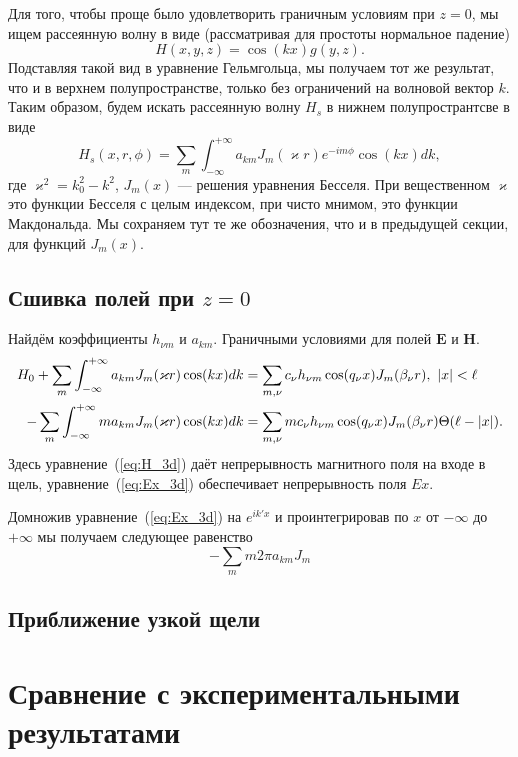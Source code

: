 Для того, чтобы проще было удовлетворить граничным условиям при $z = 0$,
мы ищем рассеянную волну в виде (рассматривая для простоты нормальное падение)
$$
    H(x,y,z) = \cos(k x)g(y,z).
$$
Подставляя такой вид в уравнение Гельмгольца, мы получаем тот же результат, что и в верхнем полупространстве, только без ограничений на 
волновой вектор $k$. Таким образом, будем искать рассеянную волну $H_s$ в нижнем полупространтсве в виде
\begin{equation}
    H_{s}(x,r,\phi) = \sum_{m} \int_{-\infty}^{+\infty} a_{km} J_m(\varkappa r) e^{-i m \phi} \cos(k x) dk,
\end{equation}
где $\varkappa^2 = k_0^2 - k^2$, $J_m(x)$ --- решения уравнения Бесселя. При вещественном $\varkappa$ это функции Бесселя с целым индексом, при чисто мнимом, это функции Макдональда. Мы сохраняем тут те же обозначения, что и в предыдущей секции, для функций $J_m(x)$.

\section{Сшивка полей при $z = 0$}
Найдём коэффициенты $h_{\nu m}$ и $a_{km}$. Граничными условиями для полей $\mathbf{E}$ и $\mathbf{H}$. 
\begin{align}
    H_0 +  \sum_{m} \int_{-\infty}^{+\infty} a_{km} J_m(\varkappa r) \cos(k x) dk &= \sum_{m,\nu}c_\nu h_{\nu m}\cos(q_\nu x) J_m(\beta_\nu r), \ \lvert x\rvert < \ell\label{eq:H_3d}  \\
    -\sum_{m} \int_{-\infty}^{+\infty} m a_{km} J_m(\varkappa r) \cos(k x) dk &= \sum_{m,\nu}m c_\nu h_{\nu m}\cos(q_\nu x) J_m(\beta_\nu r)\Theta(\ell- \lvert x\rvert)  \label{eq:Ex_3d}.
\end{align}
Здесь уравнение~(\ref{eq:H_3d}) даёт непрерывность магнитного поля на входе в щель, уравнение~(\ref{eq:Ex_3d}) обеспечивает непрерывность поля $Ex$.

Домножив уравнение~(\ref{eq:Ex_3d}) на $e^{i k' x}$ и проинтегрировав по $x$ от $-\infty$ до $+\infty$ мы получаем следующее равенство
\begin{equation}
    -\sum_m m 2\pi a_{km} J_m{} 
\end{equation}
\section{Приближение узкой щели}

\chapter{Сравнение с экспериментальными результатами}
